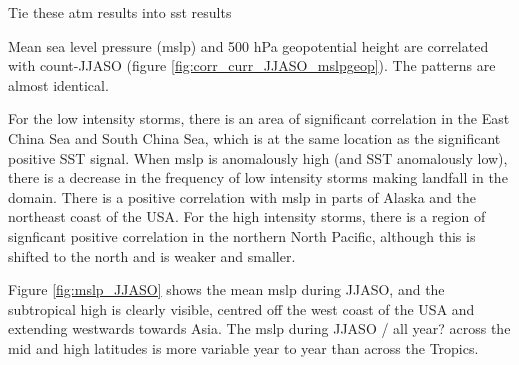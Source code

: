 Tie these atm results into sst results

Mean sea level pressure (mslp) and 500 hPa geopotential height are correlated with count-JJASO (figure \ref{fig:corr_curr_JJASO_mslpgeop}). The patterns are almost identical.

For the low intensity storms, there is an area of significant correlation in the East China Sea and South China Sea, which is at the same location as the significant positive SST signal. When mslp is anomalously high (and SST anomalously low), there is a decrease in the frequency of low intensity storms making landfall in the domain. There is a positive correlation with mslp in parts of Alaska and the northeast coast of the USA.
For the high intensity storms, there is a region of signficant positive correlation in the northern North Pacific, although this is shifted to the north and is weaker and smaller.


Figure \ref{fig:mslp_JJASO} shows the mean mslp during JJASO, and the subtropical high is clearly visible, centred off the west coast of the USA and extending westwards towards Asia. The mslp during JJASO / all year? across the mid and high latitudes is more variable year to year than across the Tropics.

